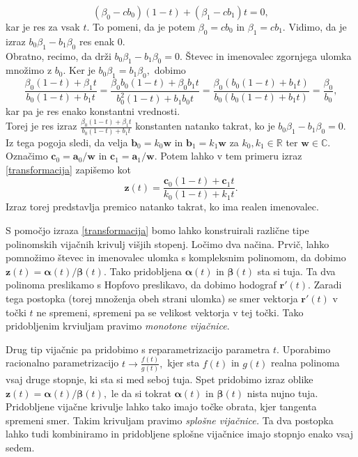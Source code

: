 \documentclass[12pt,a4paper,twoside]{article}
\theoremstyle{definition} %
\theoremstyle{plain} %
\numberwithin{equation}{section}  %
\newcommand{\R}{\mathbb R}
\renewcommand{\C}{\mathbb C}
\newcommand{\aV}{\mathbf{a}}
\newcommand{\bV}{\mathbf{b}}
\newcommand{\cV}{\mathbf{c}}
\newcommand{\rV}{\mathbf{r}}
\newcommand{\wV}{\mathbf{w}}
\newcommand{\zV}{\mathbf{z}}
\newcommand{\balpha}{\boldsymbol \alpha}
\newcommand{\bbeta}{\boldsymbol \beta}
\begin{document}
\begin{itemize}
	\begin{equation*}
		(\beta_0-cb_0)(1-t)+(\beta_1-cb_1)t=0,
	\end{equation*}
	kar je res za vsak $t.$ To pomeni, da je potem $\beta_0=cb_0$ in $\beta_1=cb_1.$ Vidimo, da je izraz $b_0\beta_1-b_1\beta_0$ res enak 0.\\
	Obratno, recimo, da drži $b_0\beta_1-b_1\beta_0=0.$ Števec in imenovalec zgornjega ulomka množimo z $b_0.$ Ker je $b_0\beta_1=b_1\beta_0,$ dobimo
	\begin{equation*}
		\frac{\beta_0(1-t)+\beta_1t}{b_0(1-t)+b_1t}=\frac{\beta_0b_0(1-t)+\beta_0b_1t}{b_0^2(1-t)+b_1b_0t}=\frac{\beta_0(b_0(1-t)+b_1t)}{b_0(b_0(1-t)+b_1t)}=\frac{\beta_0}{b_0},
	\end{equation*}
	kar pa je res enako konstantni vrednosti.\\
	Torej je res izraz $\frac{\beta_0(1-t)+\beta_1t}{b_0(1-t)+b_1t}$ konstanten natanko takrat, ko je $b_0\beta_1-b_1\beta_0=0.$ Iz tega pogoja sledi, da velja $\bV_0=k_0\wV$ in $\bV_1=k_1\wV$ za $k_0,k_1\in\R$ ter $\wV\in\C.$ Označimo $\cV_0=\aV_0/\wV$ in $\cV_1=\aV_1/\wV.$ Potem lahko v tem primeru izraz \eqref{transformacija} zapišemo kot
	\begin{equation*}
		\zV(t)=\frac{\cV_0(1-t)+\cV_1t}{k_0(1-t)+k_1t}.
	\end{equation*}
	Izraz torej predstavlja premico natanko takrat, ko ima realen imenovalec.
\end{itemize}
S pomočjo izraza \eqref{transformacija} bomo lahko konstruirali različne tipe polinomskih vijačnih krivulj višjih stopenj. Ločimo dva načina. Prvič, lahko pomnožimo števec in imenovalec ulomka s kompleksnim polinomom, da dobimo $\zV(t)=\balpha(t)/\bbeta(t).$ Tako pridobljena $\balpha(t)$ in $\bbeta(t)$ sta si tuja. Ta dva polinoma preslikamo s Hopfovo preslikavo, da dobimo hodograf $\rV'(t).$ Zaradi tega postopka (torej množenja obeh strani ulomka) se smer vektorja $\rV'(t)$ v točki $t$ ne spremeni, spremeni pa se velikost vektorja v tej točki. Tako pridobljenim krviuljam pravimo \emph{monotone vijačnice}.

Drug tip vijačnic pa pridobimo s reparametrizacijo parametra $t.$ Uporabimo racionalno parametrizacijo $t\to\frac{f(t)}{g(t)},$ kjer sta $f(t)$ in $g(t)$ realna polinoma vsaj druge stopnje, ki sta si med seboj tuja. Spet pridobimo izraz oblike $\zV(t)=\balpha(t)/\bbeta(t),$ le da si tokrat $\balpha(t)$ in $\bbeta(t)$ nista nujno tuja. Pridobljene vijačne krivulje lahko tako imajo točke obrata, kjer tangenta spremeni smer. Takim krivuljam pravimo \emph{splošne vijačnice.} Ta dva postopka lahko tudi kombiniramo in pridobljene splošne vijačnice imajo stopnjo enako vsaj sedem.
\end{document}
